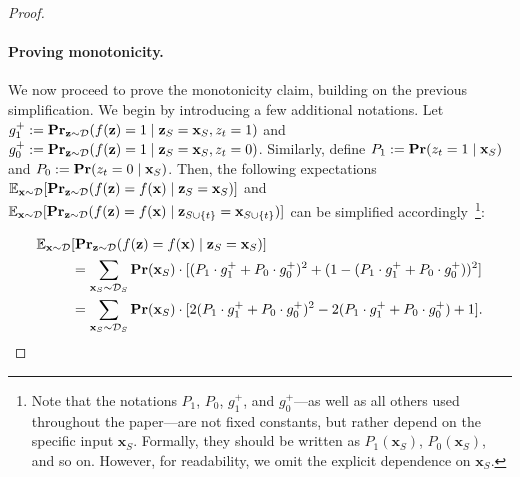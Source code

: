 \documentclass{article}
\newcommand{\z}{\textbf{z}}
\newcommand{\x}{\textbf{x}}
\newcommand{\fml}[1]{{\mathcal{#1}}}
\newcommand{\mbf}[1]{\ensuremath\mathbf{#1}}
\newcommand{\mbb}[1]{\ensuremath\mathbb{#1}}
\begin{document}
\begin{proof}
\paragraph{Proving monotonicity.}
%
We now proceed to prove the monotonicity claim, building on the previous simplification. We begin by introducing a few additional notations. Let $g_{1}^{+} := \mbf{Pr}_{\z \sim \mathcal{D}}(f(\z) = 1 \mid \z_{S} = \x_{S}, z_t = 1)$ and $g_{0}^{+} := \mbf{Pr}_{\z \sim \mathcal{D}}(f(\z) = 1 \mid \z_{S} = \x_{S}, z_t = 0)$. Similarly, define $P_{1} := \mbf{Pr}(z_t = 1 \mid \x_{S})$ and $P_{0} := \mbf{Pr}(z_t = 0 \mid \x_{S})$.
Then, the following expectations $\mbb{E}_{\x\sim \mathcal{D}}[\mbf{Pr}_{\z\sim \mathcal{D}}(f(\z) = f(\x) \mid \z_{S} = \x_{S})]$ 
and $\mbb{E}_{\x\sim \mathcal{D}}[\mbf{Pr}_{\z\sim \mathcal{D}}(f(\z) = f(\x) \mid \z_{S\cup\{t\}} = \x_{S\cup\{t\}})]$ can be simplified accordingly~\footnote{
Note that the notations $P_{1}$, $P_{0}$, $g_{1}^{+}$, and $g_{0}^{+}$—as well as all others used throughout the paper—are not fixed constants, but rather depend on the specific input $\x_{S}$. Formally, they should be written as $P_{1}(\x_{S})$, $P_{0}(\x_{S})$, and so on. However, for readability, we omit the explicit dependence on $\x_{S}$.}:






\begin{equation}
\begin{aligned}
\mbb{E}_{\x\sim \mathcal{D}}&[\mbf{Pr}_{\z\sim \mathcal{D}}(f(\z) = f(\x) \mid \z_{S} = \x_{S})] \\
&= \sum_{\x_{S} \sim \fml{D}_{S}} \mbf{Pr}(\x_{S}) \cdot [(P_{1} \cdot g_{1}^{+} + P_{0} \cdot g_{0}^{+})^2 + (1 - (P_{1} \cdot g_{1}^{+} + P_{0} \cdot g_{0}^{+}))^2] \\
&= \sum_{\x_{S} \sim \fml{D}_{S}} \mbf{Pr}(\x_{S}) \cdot [2(P_{1} \cdot g_{1}^{+} + P_{0} \cdot g_{0}^{+})^2 - 2(P_{1} \cdot g_{1}^{+} + P_{0} \cdot g_{0}^{+}) + 1].
\end{aligned}
\end{equation}


\end{proof}
\end{document}
